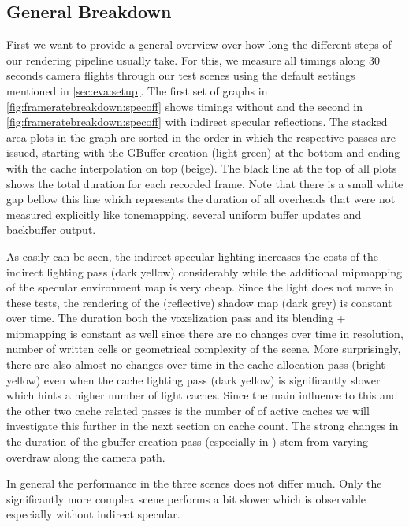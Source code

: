 \documentclass[thesis.tex]{subfiles}
\begin{document}
\subsection{General Breakdown}
First we want to provide a general overview over how long the different steps of our rendering pipeline usually take.
For this, we measure all timings along 30 seconds camera flights through our test scenes using the default settings mentioned in \autoref{sec:eva:setup}.
The first set of graphs in \autoref{fig:frameratebreakdown:specoff} shows timings without and the second in \autoref{fig:frameratebreakdown:specoff} with indirect specular reflections.
The stacked area plots in the graph are sorted in the order in which the respective passes are issued, starting with the GBuffer creation (light green) at the bottom and ending with the cache interpolation on top (beige).
The black line at the top of all plots shows the total duration for each recorded frame.
Note that there is a small white gap bellow this line which represents the duration of all overheads that were not measured explicitly like tonemapping, several uniform buffer updates and backbuffer output.

As easily can be seen, the indirect specular lighting increases the costs of the indirect lighting pass (dark yellow) considerably while the additional mipmapping of the specular environment map is very cheap.
Since the light does not move in these tests, the rendering of the (reflective) shadow map (dark grey) is constant over time.
The duration both the voxelization pass and its blending + mipmapping is constant as well since there are no changes over time in resolution, number of written cells or geometrical complexity of the scene.
More surprisingly, there are also almost no changes over time in the cache allocation pass (bright yellow) even when the cache lighting pass (dark yellow) is significantly slower which hints a higher number of light caches.
Since the main influence to this and the other two cache related passes is the number of of active caches we will investigate this further in the next section on cache count. 
The strong changes in the duration of the gbuffer creation pass (especially in ) stem from varying overdraw along the camera path. 

In general the performance in the three scenes does not differ much.
Only the significantly more complex  scene performs a bit slower which is observable especially without indirect specular.
\end{document}
